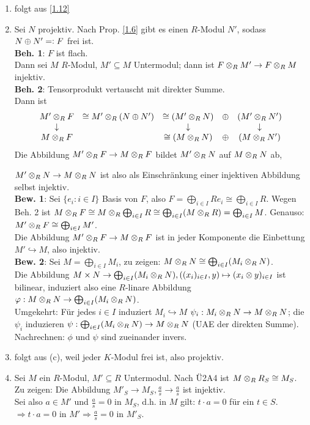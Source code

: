 \documentclass[a4paper, 10pt]{report}
\begin{document}
\begin{Bew}
\begin{enumerate}
\item folgt aus \ref{1.12}
\item Sei $N$ projektiv. Nach Prop. \ref{1.6} gibt es einen $R$-Modul
$N'$, sodass $N \oplus N'=\mathrel{\mathop:} F$ frei ist.\\ \textbf{Beh. 1}: $F$ ist flach.\\
Dann sei $M$ $R$-Modul, $M'\subseteq M$ Untermodul; dann ist $F\ten[R] M'\to F\ten[R] M$ injektiv.\\
\textbf{Beh. 2}: Tensorprodukt vertauscht mit direkter Summe.\\
Dann ist
\[
\begin{array}{ccccc}
M'\ten[R] F & \cong M'\ten[R](N\oplus N')   &\cong (M'\ten[R] N)&\oplus &(M'\ten[R] N') \\
\downarrow &                                 &\downarrow               &   &\downarrow\\
M\ten[R] F &                               &\cong (M\ten[R] N)&\oplus &(M\ten[R] N')\\
\end{array}
\]
Die Abbildung $M'\ten[R] F\to M\ten[R] F$ bildet $M'\ten[R] N$ auf $M\ten[R] N$ ab,

$M'\ten[R] N\to M\ten[R] N$ ist also als Einschr\"ankung einer injektiven Abbildung selbst injektiv.\\
\textbf{Bew. 1}: Sei $\{e_i:i\in I\}$ Basis  von $F$, also $F=\bigoplus_{i\in I} R e_i\cong \bigoplus_{i\in I} R$.
Wegen Beh. 2 ist $M\ten[R] F\cong M\ten[R] \bigoplus_{i\in I}R\cong \bigoplus_{i\in I}(M\ten[R] R)=\bigoplus_{i\in I}M$.
Genauso: $M' \ten[R] F\cong \bigoplus_{i\in I}M'$.\\
Die Abbildung $M'\ten[R] F\to M\ten[R] F$ ist in jeder Komponente die Einbettung $M'\hookrightarrow M$, also injektiv.\\
\textbf{Bew. 2}: Sei $M=\bigoplus_{i\in I} M_i$, zu zeigen: $M\ten[R] N \cong \bigoplus_{i\in I}(M_i\ten[R] N)$.\\
Die Abbildung $M\times N \to \bigoplus_{i\in I} (M_i\ten[R] N), \left((x_i)_{i \in I}, y\right)\mapsto (x_i\ten y)_{i\in I}$ ist bilinear, induziert
also eine $R$-linare Abbildung $\varphi: M\ten[R] N\to \bigoplus_{i\in I}(M_i\ten[R] N)$.\\
Umgekehrt: F\"ur jedes $i\in I$ induziert $M_i\hookrightarrow M$ $\psi_i : M_i\ten[R] N\to M\ten[R] N$;
die $\psi_i$ induzieren $\psi:\bigoplus_{i\in I}(M_i\ten[R] N)\to M\ten[R] N$ (UAE der direkten Summe).
\glqq Nachrechnen\grqq: $\phi$ und $\psi$ sind zueinander invers. 
\item folgt aus (c), weil jeder $K$-Modul frei ist, also projektiv.
\item Sei $M$ ein $R$-Modul, $M'\subseteq R$ Untermodul.
Nach \"U2A4 ist $M\ten[R] R_S \cong M_S$.\\
Zu zeigen: Die Abbildung $M'_S\to M_S, \frac{a}{s}\to \frac{a}{s}$ ist injektiv. \\
Sei also $a\in M'$ und $\frac{a}{s}=0$ in $M_S$, d.h. in $M$ gilt: $t\cdot a=0$ f\"ur ein $t\in S$.
$\Rightarrow t\cdot a = 0$ in $M'\Rightarrow \frac{a}{s}=0$ in $M'_S$.


\end{enumerate}
\end{Bew}
\end{document}
